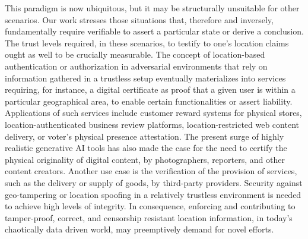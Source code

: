 This paradigm is now ubiquitous, but it may be structurally unsuitable for other scenarios. Our work stresses those situations that, therefore and inversely, fundamentally require verifiable \pol{} to assert a particular state or derive a conclusion. The trust levels required, in these scenarios, to testify to one's location claims ought as well to be crucially measurable. The concept of location-based authentication or authorization in adversarial environments that rely on information gathered in a trustless setup eventually materializes into services requiring, for instance, a digital certificate as proof that a given user is within a particular geographical area, to enable certain functionalities or assert liability. Applications of such services include customer reward systems for physical stores, location-authenticated business review platforms, location-restricted web content delivery, or voter's physical presence attestation. The present surge of highly realistic generative AI tools has also made the case for the need to certify the physical originality of digital content, by photographers, reporters, and other content creators. Another use case is the verification of the provision of services, such as the delivery or supply of goods, by third-party providers. Security against geo-tampering or location spoofing in a relatively trustless environment is needed to achieve high levels of integrity. In consequence, enforcing and contributing to tamper-proof, correct, and censorship resistant location information, in today's chaotically data driven world, may preemptively demand for novel efforts. 

